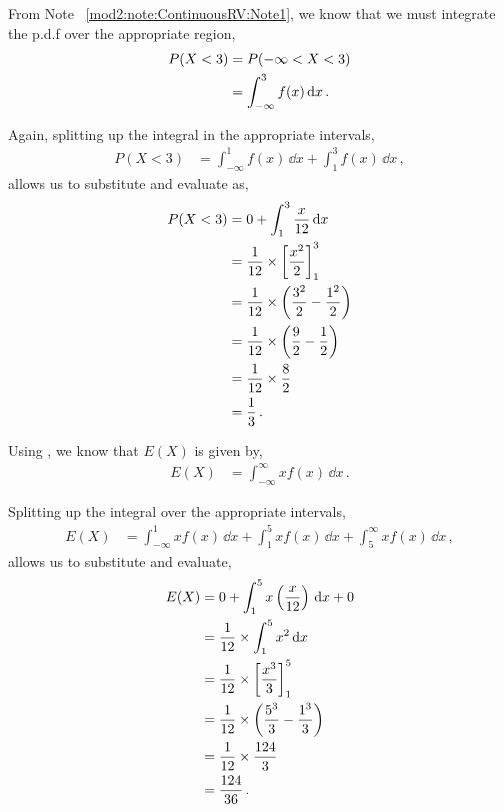 \begin{subquestions}
From Note ~\ref{mod2:note:ContinuousRV:Note1}, we know that we must integrate the p.d.f over the appropriate region,
\begin{align}
	P(X<3) & = P(-\infty<X<3) \nonumber \\
	       & = \int_{-\infty}^{3} f(x)\, \mathrm{d} x \,.
\end{align}

Again, splitting up the integral in the appropriate intervals,
\begin{align}
	P(X<3) & = \int_{-\infty}^{1} f(x)\,\dd x + \int_{1}^{3} f(x)\, \dd x \,,
\end{align}
allows us to substitute and evaluate as,
\begin{align}
	P(X<3) & = 0 + \int_{1}^{3}\frac{x}{12} \, \mathrm{d} x \nonumber \\
	       & = \frac{1}{12} \times \left[\frac{x^2}{2}\right]^3_1 \nonumber \\
	       & = \frac{1}{12} \times \left(\frac{3^2}{2} - \frac{1^2}{2}\right) \nonumber \\
	       & = \frac{1}{12} \times \left(\frac{9}{2} - \frac{1}{2}\right) \nonumber \\
	       & = \frac{1}{12} \times \frac{8}{2} \nonumber \\
	       & = \frac{1}{3} \,. 
\end{align}
	

\subquestion

Using , we know that $E(X)$ is given by,
\begin{align}
	E(X) & = \int_{-\infty}^{\infty} xf(x)\, \dd x \,.
\end{align}

Splitting up the integral over the appropriate intervals,
\begin{align}
	E(X) & = \int_{-\infty}^{1} xf(x)\,\dd x + \int_{1}^{5} xf(x)\,\dd x + \int_{5}^{\infty} xf(x)\,\dd x \,,
\end{align}
allows us to substitute and evaluate,
\begin{align}
	E(X)& = 0 + \int_{1}^{5} x\left( \frac{x}{12}\right)\,\mathrm{d} x + 0\nonumber \\
		 & = \frac{1}{12} \times \int_{1}^{5} x^2\,\mathrm{d} x \nonumber \\ 
		 & = \frac{1}{12} \times \left[\frac{x^3}{3}\right]^5_1 \nonumber \\
		 & = \frac{1}{12} \times \left(\frac{5^3}{3}-\frac{1^3}{3}\right) \nonumber \\
		 & = \frac{1}{12} \times \frac{124}{3} \nonumber \\
		 & = \frac{124}{36} \,.
\end{align}


\end{subquestions}

